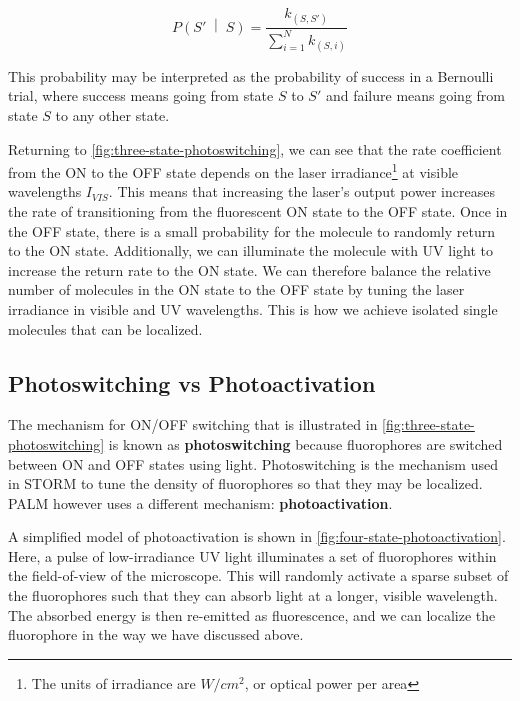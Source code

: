 \documentclass[10pt,a4paper,oneside]{book}
\newcommand{\given}{\;\middle|\;}
\begin{document}
\begin{equation}
    P \left(S' \given S \right) = \frac{k_{\left( S, S' \right)}}{\sum_{i = 1}^N k_{ \left( S, i \right) }}
\end{equation}

\noindent This probability may be interpreted as the probability of success in a Bernoulli trial, where success means going from state $S$ to $S'$ and failure means going from state $S$ to any other state.

Returning to \autoref{fig:three-state-photoswitching}, we can see that the rate coefficient from the ON to the OFF state depends on the laser irradiance\footnote{The units of irradiance are $W / cm^2$, or optical power per area} at visible wavelengths $I_{VIS}$. This means that increasing the laser's output power increases the rate of transitioning from the fluorescent ON state to the OFF state. Once in the OFF state, there is a small probability for the molecule to randomly return to the ON state. Additionally, we can illuminate the molecule with UV light to increase the return rate to the ON state. We can therefore balance the relative number of molecules in the ON state to the OFF state by tuning the laser irradiance in visible and UV wavelengths. This is how we achieve isolated single molecules that can be localized.

\subsection{Photoswitching vs Photoactivation}

The mechanism for ON/OFF switching that is illustrated in \autoref{fig:three-state-photoswitching} is known as \textbf{photoswitching} because fluorophores are switched between ON and OFF states using light. Photoswitching is the mechanism used in STORM to tune the density of fluorophores so that they may be localized. PALM however uses a different mechanism: \textbf{photoactivation}.

A simplified model of photoactivation is shown in \autoref{fig:four-state-photoactivation}. Here, a pulse of low-irradiance UV light illuminates a set of fluorophores within the field-of-view of the microscope. This will randomly activate a sparse subset of the fluorophores such that they can absorb light at a longer, visible wavelength. The absorbed energy is then re-emitted as fluorescence, and we can localize the fluorophore in the way we have discussed above.
\end{document}

